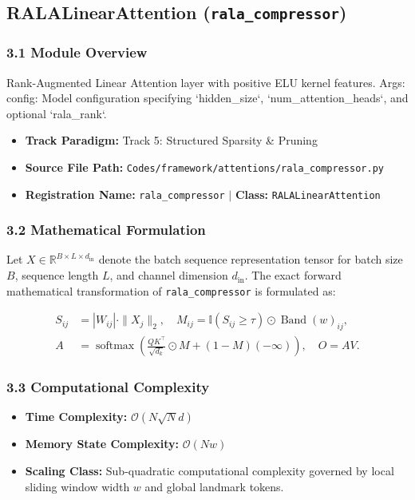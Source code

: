 \subsection{RALALinearAttention (\texttt{rala\_compressor})}
\label{sec:app_module_rala_compressor}

\subsubsection*{3.1 Module Overview}
Rank-Augmented Linear Attention layer with positive ELU kernel features.  Args:     config: Model configuration specifying `hidden\_size`, `num\_attention\_heads`, and optional `rala\_rank`.
\begin{itemize}
    \item \textbf{Track Paradigm:} Track 5: Structured Sparsity & Pruning
    \item \textbf{Source File Path:} \texttt{Codes/framework/attentions/rala\_compressor.py}
    \item \textbf{Registration Name:} \texttt{rala\_compressor} $\mid$ \textbf{Class:} \texttt{RALALinearAttention}
\end{itemize}

\subsubsection*{3.2 Mathematical Formulation}
Let $X \in \mathbb{R}^{B \times L \times d_{\text{in}}}$ denote the batch sequence representation tensor for batch size $B$, sequence length $L$, and channel dimension $d_{\text{in}}$. The exact forward mathematical transformation of \texttt{rala\_compressor} is formulated as:

\begin{align}
S_{ij} &= |W_{ij}| \cdot \|X_j\|_2, \quad M_{ij} = \mathbb{I}(S_{ij} \ge \tau) \odot \operatorname{Band}(w)_{ij}, \\
A &= \operatorname{softmax}\left(\frac{Q K^\top}{\sqrt{d_k}} \odot M + (1 - M)(-\infty)\right), \quad O = A V.
\end{align}


\subsubsection*{3.3 Computational Complexity}
\begin{itemize}
    \item \textbf{Time Complexity:} $\mathcal{O}(N \sqrt{N} d)$
    \item \textbf{Memory State Complexity:} $\mathcal{O}(N w)$
    \item \textbf{Scaling Class:} Sub-quadratic computational complexity governed by local sliding window width $w$ and global landmark tokens.
\end{itemize}

